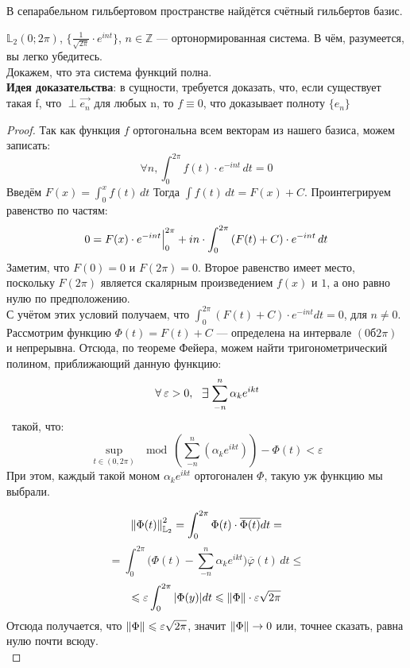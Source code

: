 \documentclass[12pt]{article}
\begin{document}
	\begin{state}
		В сепарабельном гильбертовом пространстве найдётся счётный гильбертов базис.
	\end{state}
	
	\example $\mathbb{L}_2 (0; 2\pi)$, $\{ \frac{1}{\sqrt{2\pi}} \cdot e^{int} \}$, $n \in \mathbb{Z}$ --- ортонормированная система.
	{\color{gray} В чём, разумеется, вы легко убедитесь.}\\
	Докажем, что эта система функций полна.\\
	\textbf{Идея доказательства}: в сущности, требуется доказать, что, если существует такая f, что $\perp \vec{e_n}$
	для любых n, то $f \equiv 0$, что доказывает полноту $\{ e_n \}$
	\begin{proof}
		Так как функция $f$ ортогональна всем векторам из нашего базиса, можем записать:
		$$ \forall n, \int_0^{2\pi} f(t) \cdot e^{-int} \,dt = 0 $$
		Введём $F(x) = \int_0^x f(t) \,dt$ Тогда $\int f(t) \,dt = F(x) + C$. Проинтегрируем равенство по частям:
		$$ 0 = F(x) \cdot e^{-int} \Big|_{0}^{2\pi} 
		   + i n \cdot \int_0^{2\pi} \left(F(t) + C\right) \cdot e^{-int} \,dt $$
		Заметим, что $F(0) = 0$ и $F(2\pi) = 0$. Второе равенство имеет место, поскольку $F(2\pi)$ является 
        скалярным произведением $f(x)$ и $1$, а оно равно нулю по предположению. \\
		С учётом этих условий получаем, что $\int_0^{2\pi} (F(t) + C) \cdot e^{-int} dt = 0$, для $n \neq 0$. \\
		Рассмотрим функцию $\Phi(t) = F(t) + C$ --- определена на интервале $(0б 2\pi)$ и непрерывна.
		Отсюда, по теореме Фейера, можем найти тригонометрический полином, приближающий данную функцию:
		$$\forall \varepsilon > 0,\, \:\Exists\! \sum_{-n}^n \alpha_k e^{ikt}$$\
		такой, что:
		$$ \underset{t \in (0,2\pi)}{\sup} \mod{(\sum_{-n}^n (\alpha_k e^{ikt})) - \Phi(t)} < \varepsilon $$
		При этом, каждый такой моном $\alpha_k e^{ikt}$ ортогонален $\Phi$, такую уж функцию мы выбрали.
		
		$$ \left\| \Phi(t) \right\|^2_{\mathbb{L}_2} = \int_0^{2\pi} \Phi(t) \cdot \overline{\Phi(t)} dt = $$
		$$ = \int_0^{2\pi}\Big(\Phi(t) - \sum_{-n}^n \alpha_k e^{ikt}\Big)\overline{\varphi}(t) \,dt \leq $$
		$$ \leqslant \varepsilon \int_0^{2\pi} | \Phi(y) | dt \leqslant \left\| \Phi \right\| \cdot \varepsilon\sqrt{2\pi} $$
		Отсюда получается, что $\left\| \Phi \right\| \leqslant \varepsilon \sqrt{2\pi}$, значит $\left\| \Phi \right\| \rightarrow 0$ или, точнее сказать,
		равна нулю почти всюду.\\
	\end{proof}
	
\end{document}
